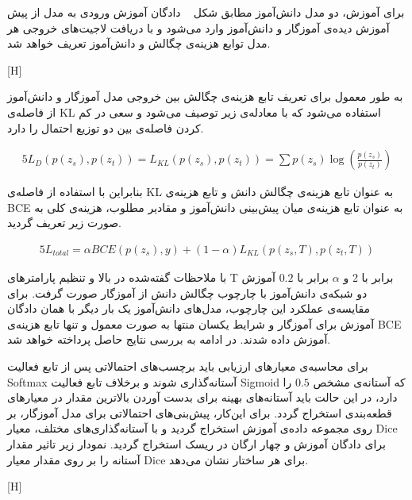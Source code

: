 برای آموزش، دو مدل دانش‌آموز مطابق شکل ~ دادگان آموزش ورودی به مدل از پیش آموزش دیده‌ی آموزگار و دانش‌آموز وارد می‌شود و با دریافت لاجیت‌های خروجی هر مدل توابع هزینه‌ی چگالش و دانش‌آموز تعریف خواهد شد.

[H]

به طور معمول برای تعریف تابع هزینه‌ی چگالش بین خروجی مدل آموزگار و دانش‌آموز از فاصله‌ی
 KL 
 استفاده می‌شود  که با معادله‌ی زیر توصیف می‌شود و سعی در کم کردن فاصله‌ی بین دو توزیع احتمال را دارد. 

\begin{alignat}{5}
	L_D(p(z_s), p(z_t)) = L_{KL}(p(z_s), p(z_t)) = \sum p(z_s) \log(\frac{p(z_s)}{p(z_t)})    \label{kldivergence} 
\end{alignat}

بنابراین با استفاده از فاصله‌ی KL به عنوان تابع هزینه‌ی چگالش دانش و تابع هزینه‌ی BCE به عنوان تابع هزینه‌ی میان پیش‌بینی دانش‌آموز و مقادیر مطلوب، هزینه‌ی کلی به صورت زیر تعریف گردید.
 
\begin{alignat}{5}
	L_{total} = \alpha BCE(p(z_s), y) + (1-\alpha)L_{KL}(p(z_s,T), p(z_t,T))     \label{bceklloss} 
\end{alignat}

با ملاحظات گفته‌شده در بالا و تنظیم پارامترهای T برابر با 2 و $\alpha$ برابر با $0.2$ آموزش دو شبکه‌ی دانش‌آموز با چارچوب چگالش دانش از آموزگار صورت گرفت. برای مقایسه‌ی عملکرد این چارچوب، مدل‌های دانش‌آموز یک‌ بار دیگر با همان دادگان آموزش برای آموزگار و شرایط یکسان منتها به صورت معمول و تنها تابع هزینه‌ی BCE آموزش داده شدند. در ادامه به بررسی نتایج حاصل پرداخته خواهد شد.


برای محاسبه‌ی معیارهای ارزیابی باید برچسب‌های احتمالاتی پس از تابع فعالیت Softmax آستانه‌گذاری شوند و برخلاف تابع فعالیت Sigmoid که آستانه‌ی مشخص $0.5$ را دارد، در این حالت باید آستانه‌های بهینه برای بدست آوردن بالاترین مقدار در معیارهای قطعه‌بندی استخراج گردد. برای این‌کار، پیش‌بنی‌های احتمالاتی برای مدل آموزگار، بر روی مجموعه‌ داده‌ی آموزش استخراج گردید و با آستانه‌گذاری‌های مختلف، معیار Dice برای دادگان آموزش و چهار ارگان در ریسک استخراج گردید. نمودار زیر تاثیر مقدار آستانه را بر روی مقدار معیار Dice برای هر ساختار نشان می‌دهد.

[H]


